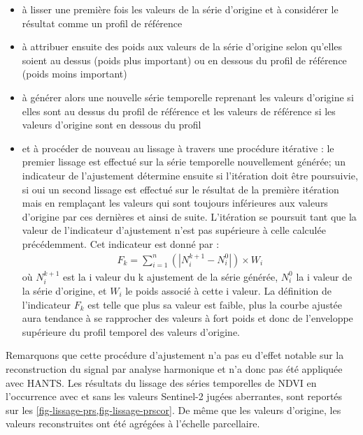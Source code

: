 \begin{itemize}
 \item à lisser une première fois les valeurs de la série d'origine et à considérer le résultat comme un profil de référence 
 \item à attribuer ensuite des poids aux valeurs de la série d'origine selon qu'elles soient au dessus (poids plus important) ou en dessous du profil de référence (poids moins important)
 \item à générer alors une nouvelle série temporelle reprenant les valeurs d'origine si elles sont au dessus du profil de référence et les valeurs de référence si les valeurs d'origine sont en dessous du profil
 \item et à procéder de nouveau au lissage à travers une procédure itérative : le premier lissage est effectué sur la série temporelle nouvellement générée; un indicateur de l'ajustement détermine ensuite si l'itération doit être poursuivie, si oui un second lissage est effectué sur le résultat de la première itération mais en remplaçant les valeurs qui sont toujours inférieures aux valeurs d'origine par ces dernières et ainsi de suite. L'itération se poursuit tant que la valeur de l'indicateur d'ajustement n'est pas supérieure à celle calculée précédemment. Cet indicateur est donné par :
 \begin{align}
   F_{k} = \sum_{i=1}^{n} (|N_{i}^{k+1} - N_{i}^{0}|) \times W_{i}
 \end{align}
 où $N_{i}^{k+1}$ est la i valeur du k ajustement de la série générée, $N_{i}^{0}$ la i valeur de la série d'origine, et $W_{i}$ le poids associé à cette i valeur. La définition de l'indicateur $F_{k}$ est telle que plus sa valeur est faible, plus la courbe ajustée aura tendance à se rapprocher des valeurs à fort poids et donc de l'enveloppe supérieure du profil temporel des valeurs d'origine.
\end{itemize}

\vspace{5mm}

Remarquons que cette procédure d'ajustement n'a pas eu d'effet notable sur la reconstruction du signal par analyse harmonique et n'a donc pas été appliquée avec HANTS. Les résultats du lissage des séries temporelles de NDVI en l'occurrence avec et sans les valeurs Sentinel-2 jugées aberrantes, sont reportés sur les \cref{fig-lissage-prs,fig-lissage-prscor}. De même que les valeurs d'origine, les valeurs reconstruites ont été agrégées à l'échelle parcellaire.

